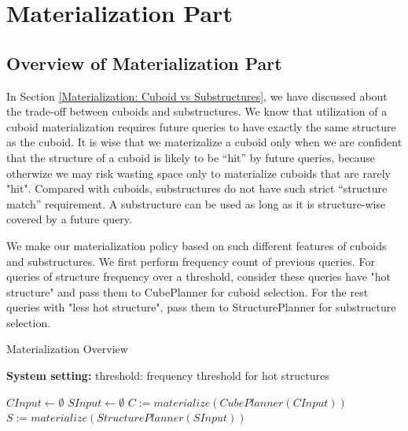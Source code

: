 \section{Materialization Part}
\label{Materialization Part}

\subsection{Overview of Materialization Part}
\label{Overview of Materialization Part}
In Section \ref{Materialization: Cuboid vs Substructures}, we have discussed about the trade-off between cuboids and substructures. We know that utilization of a cuboid materialization requires future queries to have exactly the same structure as the cuboid. It is wise that we materizalize a cuboid only when we are confident that the structure of a cuboid is likely to be ``hit'' by future queries, because otherwize we may risk wasting space only to materialize cuboids that are rarely "hit". Compared with cuboids, substructures do not have such strict ``structure match'' requirement. A substructure can be used as long as it is structure-wise covered by a future query. 

We make our materialization policy based on such different features of cuboids and substructures. 
We first perform frequency count of previous queries. For queries of structure frequency over a threshold, consider these queries have "hot structure" and pass them to CubePlanner for cuboid selection. For the rest queries with "less hot structure", pass them to StructurePlanner for substructure selection. 

\begin{algorithm}[H]
	\caption{Materialization Overview}
	\LinesNumbered
	\textbf{System setting:} threshold: frequency threshold for hot structures\\ 
	
	$CInput \gets \emptyset$ \;
	$SInput \gets \emptyset$ \;
	$C:=materialize(CubePlanner(CInput))$ \;
	$S:=materialize(StructurePlanner(SInput))$\;
\label{alg:PartialMaterialization}
\end{algorithm}
\clearpage

